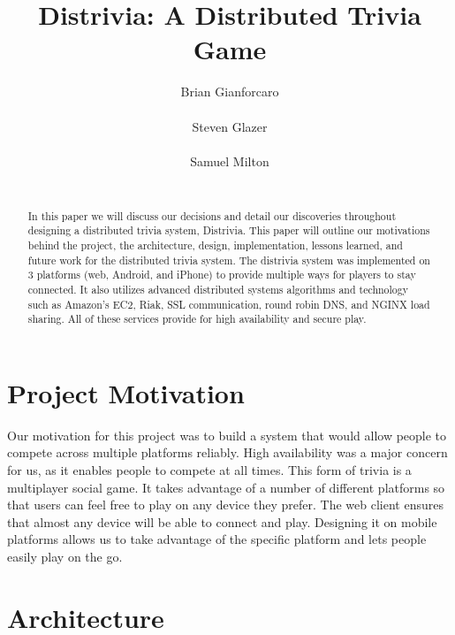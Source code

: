 \documentclass{dependencies/acm_proc_article-sp}
\begin{document}
\title{ Distrivia: A Distributed Trivia Game }
\author{
\alignauthor
Brian Gianforcaro \\
       \\
\alignauthor
Steven Glazer \\
       \\
\alignauthor
Samuel Milton \\
       \\
}
\maketitle

\begin{abstract}
In this paper we will discuss our decisions and detail our discoveries throughout designing a distributed trivia system, Distrivia. 
This paper will outline our motivations behind the project, the architecture, design, implementation, lessons learned, and future work for the distributed trivia system. 
The distrivia system was implemented on 3 platforms (web, Android, and iPhone) to provide multiple ways for players to stay connected. 
It also utilizes advanced distributed systems algorithms and technology such as Amazon's EC2, Riak, SSL communication, round robin DNS, and NGINX load sharing. 
All of these services provide for high availability and secure play.
\end{abstract}

\section{Project Motivation}
Our motivation for this project was to build a system that would allow people to compete across multiple platforms reliably.
High availability was a major concern for us, as it enables people to compete at all times.
This form of trivia is a multiplayer social game.
It takes advantage of a number of different platforms so that users can feel free to play on any device they prefer.
The web client ensures that almost any device will be able to connect and play.
Designing it on mobile platforms allows us to take advantage of the specific platform and lets people easily play on the go.

\section{Architecture}
\end{document}
